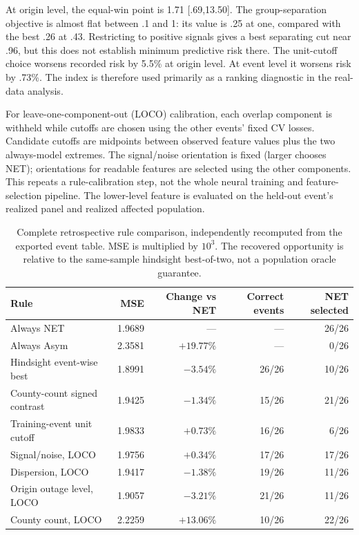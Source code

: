 At origin level, the equal-win point is 1.71 [.69,13.50]. The group-separation objective is almost flat between .1 and 1: its value is .25 at one, compared with the best .26 at .43. Restricting to positive signals gives a best separating cut near .96, but this does not establish minimum predictive risk there. The unit-cutoff choice worsens recorded risk by 5.5\% at origin level. At event level it worsens risk by .73\%. The index is therefore used primarily as a ranking diagnostic in the real-data analysis.

For leave-one-component-out (LOCO) calibration, each overlap component is withheld while cutoffs are chosen using the other events' fixed CV losses. Candidate cutoffs are midpoints between observed feature values plus the two always-model extremes. The signal/noise orientation is fixed (larger chooses NET); orientations for readable features are selected using the other components. This repeats a rule-calibration step, not the whole neural training and feature-selection pipeline. The lower-level feature is evaluated on the held-out event's realized panel and realized affected population.

\begin{table}[htbp]
\centering\small
\caption{Complete retrospective rule comparison, independently recomputed from the exported event table. MSE is multiplied by $10^3$. The recovered opportunity is relative to the same-sample hindsight best-of-two, not a population oracle guarantee.}
\label{tab:selectorfull}\label{tab:selectors}
\begin{tabular}{@{}lrrrr@{}}\toprule
Rule & MSE & Change vs NET & Correct events & NET selected\\\midrule
Always NET & 1.9689 & --- & --- & 26/26\\
Always Asym & 2.3581 & $+19.77\%$ & --- & 0/26\\
Hindsight event-wise best & 1.8991 & $-3.54\%$ & 26/26 & 10/26\\
County-count signed contrast & 1.9425 & $-1.34\%$ & 15/26 & 21/26\\
Training-event unit cutoff & 1.9833 & $+0.73\%$ & 16/26 & 6/26\\
Signal/noise, LOCO & 1.9756 & $+0.34\%$ & 17/26 & 17/26\\
Dispersion, LOCO & 1.9417 & $-1.38\%$ & 19/26 & 11/26\\
Origin outage level, LOCO & 1.9057 & $-3.21\%$ & 21/26 & 11/26\\
County count, LOCO & 2.2259 & $+13.06\%$ & 10/26 & 22/26\\\bottomrule
\end{tabular}
\end{table}

